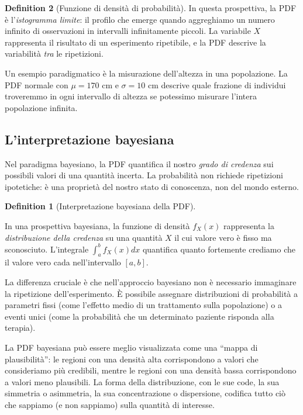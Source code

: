 \documentclass[
  letterpaper,
  DIV=11,
  numbers=noendperiod,
  oneside]{scrreprt}
\theoremstyle{definition}
\theoremstyle{plain}
\theoremstyle{definition}
\newtheorem{definition}{Definition}[chapter]
\theoremstyle{remark}
\begin{document}
\begin{definition}[Funzione di densità di
probabilità]
In questa prospettiva, la PDF è l'\emph{istogramma limite}: il profilo
che emerge quando aggreghiamo un numero infinito di osservazioni in
intervalli infinitamente piccoli. La variabile \(X\) rappresenta il
risultato di un esperimento ripetibile, e la PDF descrive la variabilità
\emph{tra} le ripetizioni.

Un esempio paradigmatico è la misurazione dell'altezza in una
popolazione. La PDF normale con \(\mu = 170\) cm e \(\sigma = 10\) cm
descrive quale frazione di individui troveremmo in ogni intervallo di
altezza se potessimo misurare l'intera popolazione infinita.

\subsection{L'interpretazione
bayesiana}\label{linterpretazione-bayesiana}

Nel paradigma bayesiano, la PDF quantifica il nostro \emph{grado di
credenza} sui possibili valori di una quantità incerta. La probabilità
non richiede ripetizioni ipotetiche: è una proprietà del nostro stato di
conoscenza, non del mondo esterno.

\begin{definition}[Interpretazione bayesiana della
PDF]\protect\hypertarget{def-bayesian-pdf}{}\label{def-bayesian-pdf}

In una prospettiva bayesiana, la funzione di densità \(f_X(x)\)
rappresenta la \emph{distribuzione della credenza} su una quantità \(X\)
il cui valore vero è fisso ma sconosciuto. L'integrale
\(\int_a^b f_X(x) dx\) quantifica quanto fortemente crediamo che il
valore vero cada nell'intervallo \([a, b]\).

\end{definition}

La differenza cruciale è che nell'approccio bayesiano non è necessario
immaginare la ripetizione dell'esperimento. È possibile assegnare
distribuzioni di probabilità a parametri fissi (come l'effetto medio di
un trattamento sulla popolazione) o a eventi unici (come la probabilità
che un determinato paziente risponda alla terapia).

La PDF bayesiana può essere meglio visualizzata come una ``mappa di
plausibilità'': le regioni con una densità alta corrispondono a valori
che consideriamo più credibili, mentre le regioni con una densità bassa
corrispondono a valori meno plausibili. La forma della distribuzione,
con le sue code, la sua simmetria o asimmetria, la sua concentrazione o
dispersione, codifica tutto ciò che sappiamo (e non sappiamo) sulla
quantità di interesse.


\end{definition}
\end{document}
